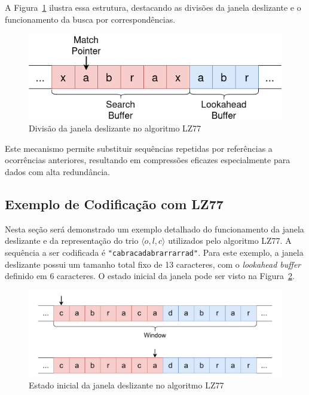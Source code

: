 A Figura~\ref{fig:Diagrama LZ77} ilustra essa estrutura, destacando as divisões da janela deslizante e o funcionamento da busca por correspondências.

\begin{figure}[ht]
	\centering
	\caption{Divisão da janela deslizante no algoritmo LZ77}
	\label{fig:Diagrama LZ77}
	\includegraphics[width=12cm]{figuras/DiagramasTCC-LZ77-template}
\end{figure}

Este mecanismo permite substituir sequências repetidas por referências a ocorrências anteriores, resultando em compressões eficazes especialmente para dados com alta redundância.

\subsection{Exemplo de Codificação com LZ77}\label{sec:LZ77_exemplo}

Nesta seção será demonstrado um exemplo detalhado do funcionamento da janela deslizante e da representação do trio $\langle o, l, c \rangle$ utilizados pelo algoritmo LZ77. A sequência a ser codificada é \texttt{"cabracadabrarrarrad"}. Para este exemplo, a janela deslizante possui um tamanho total fixo de 13 caracteres, com o \textit{lookahead buffer} definido em 6 caracteres. O estado inicial da janela pode ser visto na Figura~\ref{fig:Estado_0_LZ77}.

\begin{figure}[ht]
\centering
\caption{Estado inicial da janela deslizante no algoritmo LZ77}
\label{fig:Estado_0_LZ77}
\includegraphics[width=15cm]{figuras/DiagramasTCC-LZ77-Estado-0}
\end{figure}

